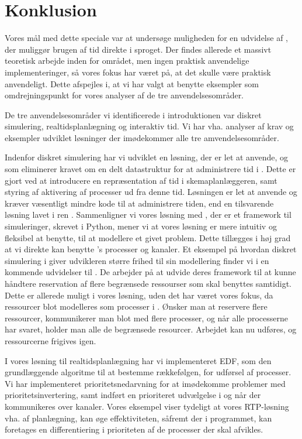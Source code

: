 \chapter{Konklusion} 
\label{chap:konklusion}
\thispagestyle{empty}

Vores mål med dette speciale var at undersøge muligheden for en udvidelse af \pycsp, der muliggør brugen af tid direkte i sproget. Der findes allerede et massivt teoretisk arbejde inden for området, men ingen praktisk anvendelige implementeringer, så vores fokus har været på, at det skulle være praktisk anvendeligt. Dette afspejles i, at vi har valgt at benytte eksempler som omdrejningspunkt for vores analyser af de tre anvendelsesområder. 

De tre anvendelsesområder vi identificerede i introduktionen var diskret simulering, realtidsplanlægning og interaktiv tid. Vi har vha. analyser af krav og eksempler udviklet løsninger der imødekommer alle tre amvendelsesområder. 

Indenfor diskret simulering har vi udviklet en løsning, der er let at anvende, og som eliminerer kravet om en delt datastruktur for at administrere tid i \pycsp. Dette er gjort ved at introducere en repræsentation af tid i skemaplanlæggeren, samt styring af aktivering af processer ud fra denne tid. Løsningen er let at anvende og kræver væsentligt mindre kode til at administrere tiden, end en tilsvarende løsning lavet i ren \pycsp. 
Sammenligner vi vores løsning med \simpy, der er et framework til simuleringer, skrevet i Python, mener vi at vores løsning er mere intuitiv og fleksibel at benytte, til at modellere et givet problem. Dette tillægges i høj grad at vi direkte kan benytte \pycsp's processer og kanaler. Et eksempel på hvordan diskret simulering i \pycsp giver udvikleren større frihed til sin modellering finder vi i en kommende udvidelser til \simpy. De arbejder  på at udvide deres framework til at kunne håndtere reservation af flere begrænsede ressourser som skal benyttes samtidigt. Dette er allerede muligt i vores løsning, uden det har været vores fokus, da ressourcer blot modelleres som processer i \pycsp. Ønsker man at reservere flere ressourcer, kommunikerer man blot med flere processer, og når alle processerne har svaret, holder man alle de begrænsede resourcer. Arbejdet kan nu udføres, og ressourcerne frigives igen. 

I vores løsning til realtidsplanlægning har vi implementeret EDF, som den grundlæggende algoritme til at bestemme rækkefølgen, for udførsel af processer. Vi har implementeret prioritetsnedarvning for at imødekomme problemer med prioritetsinvertering, samt indført en prioriteret udvælgelse i  og når der kommunikeres over kanaler. Vores eksempel viser tydeligt at vores RTP-løsning vha. af planlægning, kan øge effektiviteten, såfremt der i programmet, kan foretages en differentiering i prioriteten af de processer der skal afvikles. 

